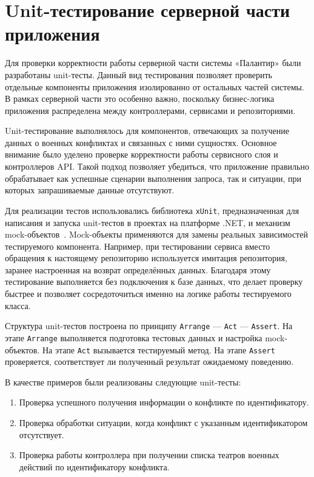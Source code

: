 \section{Unit-тестирование серверной части приложения}

Для проверки корректности работы серверной части системы «Палантир» были разработаны unit-тесты. Данный вид тестирования позволяет проверить отдельные компоненты приложения изолированно от остальных частей системы. В рамках серверной части это особенно важно, поскольку бизнес-логика приложения распределена между контроллерами, сервисами и репозиториями.

Unit-тестирование выполнялось для компонентов, отвечающих за получение данных о военных конфликтах и связанных с ними сущностях. Основное внимание было уделено проверке корректности работы сервисного слоя и контроллеров API. Такой подход позволяет убедиться, что приложение правильно обрабатывает как успешные сценарии выполнения запроса, так и ситуации, при которых запрашиваемые данные отсутствуют.

Для реализации тестов использовались библиотека \texttt{xUnit}, предназначенная для написания и запуска unit-тестов в проектах на платформе .NET, и механизм mock-объектов~\cite{xunit_getting_started}. Mock-объекты применяются для замены реальных зависимостей тестируемого компонента. Например, при тестировании сервиса вместо обращения к настоящему репозиторию используется имитация репозитория, заранее настроенная на возврат определённых данных. Благодаря этому тестирование выполняется без подключения к базе данных, что делает проверку быстрее и позволяет сосредоточиться именно на логике работы тестируемого класса.

Структура unit-тестов построена по принципу \texttt{Arrange} --- \texttt{Act} --- \texttt{Assert}. На этапе \texttt{Arrange} выполняется подготовка тестовых данных и настройка mock-объектов. На этапе \texttt{Act} вызывается тестируемый метод. На этапе \texttt{Assert} проверяется, соответствует ли полученный результат ожидаемому поведению.

В качестве примеров были реализованы следующие unit-тесты:
\begin{enumerate}
\item Проверка успешного получения информации о конфликте по идентификатору.
\item Проверка обработки ситуации, когда конфликт с указанным идентификатором отсутствует.
\item Проверка работы контроллера при получении списка театров военных действий по идентификатору конфликта.
\end{enumerate}

